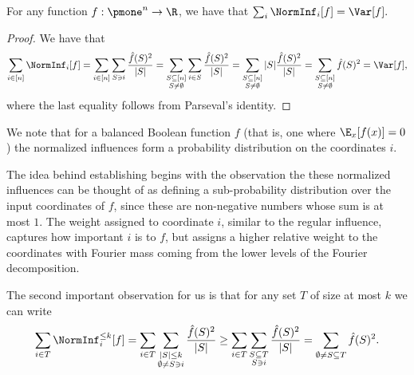 \begin{claim}
For any function $f:\pmone^n\to\R$, we have that $\sum_i\NormInf_i[f] = \Var[f].$
\end{claim}
\begin{proof}
We have that
\[
\sum_{i\in [n]}\NormInf_i[f] = \sum_{i \in [n]}\sum_{ S \ni i}\frac{\hat{f}(S)^2}{|S|} = \sum_{\substack{ S \subseteq[n] \\ S \neq \emptyset}}\sum_{i \in S}\frac{\hat{f}(S)^2}{|S|} = \sum_{\substack{ S \subseteq[n] \\ S \neq \emptyset}}|S|\frac{\hat{f}(S)^2}{|S|} = \sum_{\substack{ S \subseteq[n] \\ S \neq \emptyset}}\hat{f}(S)^2 = \Var[f],
\]
where the last equality follows from Parseval's identity.
\end{proof}
\begin{remark}
We note that for a balanced Boolean function $f$ (that is, one where $\E_x[f(x)] = 0$) the normalized influences form a probability distribution on the coordinates $i$.
\end{remark}
The idea behind establishing   begins with the observation the these normalized influences can be thought of as defining a sub-probability distribution over the input coordinates of $f$, since these are non-negative numbers whose  sum is at most $1$. The weight assigned to coordinate $i$, similar to the regular influence, captures how important $i$ is to $f$, but assigns a higher relative weight to the coordinates with Fourier mass coming from the lower levels of the Fourier decomposition. 

The second important observation for us is that for any set $T$ of size at most $k$ we can write 
\begin{equation}
\label{eq:normed-infs}
    \sum_{i\in T} \NormInf_i^{\leq k}[f] = \sum_{i\in T} \sum_{\substack{|S| \leq k\\\emptyset \neq S \ni i}} \frac{\hat{f}(S)^2}{|S|} \geq \sum_{i\in T} \sum_{\substack{ S \subseteq T \\ S \ni i}}  \frac{\hat{f}(S)^2}{|S|} = \sum_{\emptyset \neq S \subseteq T}\hat{f}(S)^2.
\end{equation}

